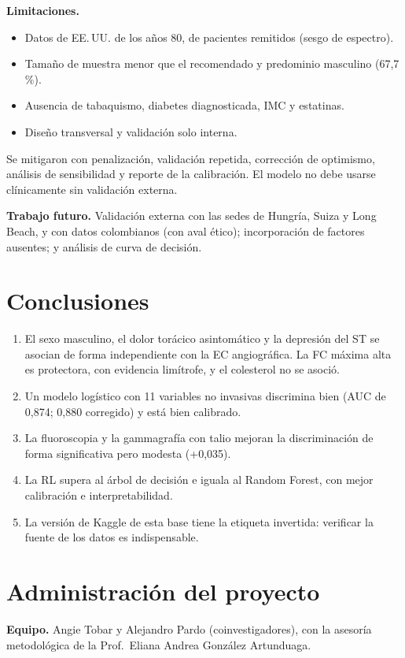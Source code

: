 \documentclass[twocolumn,10pt]{article}
\begin{document}
\textbf{Limitaciones.}
\begin{itemize}
\item Datos de EE.\,UU. de los a\~nos 80, de pacientes remitidos (sesgo de espectro).
\item Tama\~no de muestra menor que el recomendado y predominio masculino (67,7\,\%).
\item Ausencia de tabaquismo, diabetes diagnosticada, IMC y estatinas.
\item Dise\~no transversal y validaci\'on solo interna.
\end{itemize}
Se mitigaron con penalizaci\'on, validaci\'on repetida, correcci\'on de optimismo, an\'alisis de sensibilidad y reporte de la calibraci\'on. El modelo no debe usarse cl\'inicamente sin validaci\'on externa.

\textbf{Trabajo futuro.} Validaci\'on externa con las sedes de Hungr\'ia, Suiza y Long Beach, y con datos colombianos (con aval \'etico); incorporaci\'on de factores ausentes; y an\'alisis de curva de decisi\'on.

\section{Conclusiones}
\begin{enumerate}
\item El sexo masculino, el dolor tor\'acico asintom\'atico y la depresi\'on del ST se asocian de forma independiente con la EC angiogr\'afica. La FC m\'axima alta es protectora, con evidencia lim\'itrofe, y el colesterol no se asoci\'o.
\item Un modelo log\'istico con 11 variables no invasivas discrimina bien (AUC de 0,874; 0,880 corregido) y est\'a bien calibrado.
\item La fluoroscopia y la gammagraf\'ia con talio mejoran la discriminaci\'on de forma significativa pero modesta (+0,035).
\item La RL supera al \'arbol de decisi\'on e iguala al Random Forest, con mejor calibraci\'on e interpretabilidad.
\item La versi\'on de Kaggle de esta base tiene la etiqueta invertida: verificar la fuente de los datos es indispensable.
\end{enumerate}

\section{Administraci\'on del proyecto}
\textbf{Equipo.} Angie Tobar y Alejandro Pardo (coinvestigadores), con la asesor\'ia metodol\'ogica de la Prof.\ Eliana Andrea Gonz\'alez Artunduaga.
\end{document}
